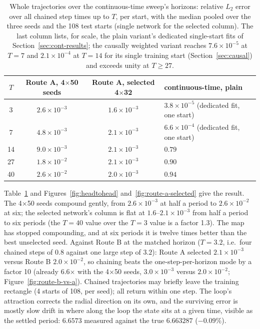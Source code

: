 \documentclass[11pt,a4paper]{article}
\begin{document}
\begin{table}[tbp]
  \centering
  \caption{Whole trajectories over the continuous-time sweep's horizons:
  relative $L_2$ error over all chained step times up to $T$, per start,
  with the median pooled over the three seeds and the 108 test starts
  (single network for the selected column). The last column lists, for
  scale, the plain variant's dedicated single-start fits of
  Section~\ref{sec:cont-results}; the causally weighted variant reaches
  $7.6\times10^{-5}$ at $T=7$ and $2.1\times10^{-4}$ at $T=14$ for its
  single training start (Section~\ref{sec:causal}) and exceeds unity at
  $T \ge 27$.}
  \label{tab:routes}
  \small
  \begin{tabular}{cccl}
    \toprule
    $T$ & Route A, 4$\times$50 seeds & Route A, selected 4$\times$32 & continuous-time, plain \\
    \midrule
    3  & $2.6\times10^{-3}$ & $1.6\times10^{-3}$ & $3.8\times10^{-5}$ (dedicated fit, one start) \\
    7  & $4.8\times10^{-3}$ & $2.1\times10^{-3}$ & $6.6\times10^{-4}$ (dedicated fit, one start) \\
    14 & $9.0\times10^{-3}$ & $2.1\times10^{-3}$ & $0.79$ \\
    27 & $1.8\times10^{-2}$ & $2.1\times10^{-3}$ & $0.90$ \\
    40 & $2.6\times10^{-2}$ & $2.0\times10^{-3}$ & $0.94$ \\
    \bottomrule
  \end{tabular}
\end{table}

Table~\ref{tab:routes} and Figures~\ref{fig:headtohead}
and~\ref{fig:route-a-selected} give the result. The 4$\times$50 seeds
compound gently, from $2.6\times10^{-3}$ at half a period to
$2.6\times10^{-2}$ at six; the selected network's column is flat at
$1.6$--$2.1\times10^{-3}$ from half a period to six periods (the $T=40$
value over the $T=3$ value is a factor 1.3). The map has stopped
compounding, and at six periods it is twelve times better than the best
unselected seed. Against Route B at the matched horizon ($T = 3.2$,
i.e.\ four chained steps of $0.8$ against one large step of $3.2$):
Route A selected $2.1\times10^{-3}$ versus Route B $2.0\times10^{-2}$,
so chaining beats the one-step-per-horizon mode by a factor 10 (already
6.6$\times$ with the 4$\times$50 seeds, $3.0\times10^{-3}$ versus
$2.0\times10^{-2}$; Figure~\ref{fig:route-b-vs-a}). Chained trajectories
may briefly leave the training rectangle (4 starts of 108, per seed);
all return within one step. The loop's attraction corrects the radial
direction on its own, and the surviving error is mostly slow drift in
where along the loop the state sits at a given time, visible as the
settled period: $6.6573$ measured against the true $6.663287$
($-0.09\%$).
\end{document}

